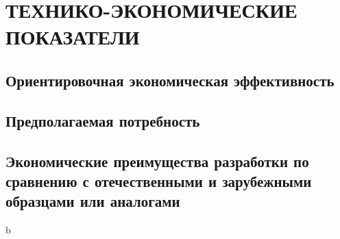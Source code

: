 \section{ТЕХНИКО-ЭКОНОМИЧЕСКИЕ ПОКАЗАТЕЛИ}

\subsection{Ориентировочная экономическая эффективность}

\subsection{Предполагаемая потребность}

\subsection{Экономические преимущества разработки по сравнению с отечественными и зарубежными образцами или аналогами}
    
b
\clearpage